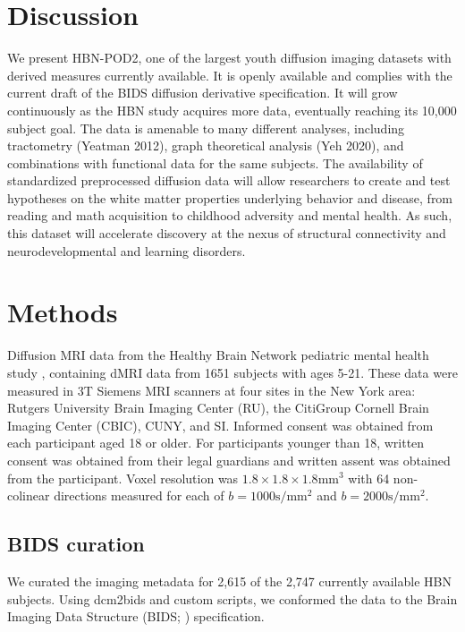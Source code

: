 \documentclass[fleqn,10pt]{wlscirep}
\begin{document}
\section*{Discussion}

We present HBN-POD2, one of the largest youth diffusion imaging datasets with derived measures currently available. It is openly available and complies with the current draft of the BIDS diffusion derivative specification. It will grow continuously as the HBN study acquires more data, eventually reaching its 10,000 subject goal. The data is amenable to many different analyses, including tractometry (Yeatman 2012), graph theoretical analysis (Yeh 2020), and combinations with functional data for the same subjects. The availability of standardized preprocessed diffusion data will allow researchers to create and test hypotheses on the white matter properties underlying behavior and disease, from reading and math acquisition to childhood adversity and mental health. As such, this dataset will accelerate discovery at the nexus of structural connectivity and neurodevelopmental and learning disorders.

\section*{Methods}


Diffusion MRI data from the Healthy Brain Network pediatric mental health study \cite{alexander2017-yc}, containing dMRI data from 1651 subjects with ages 5-21. These data were measured in 3T Siemens MRI scanners at four sites in the New York area: Rutgers University Brain Imaging Center (RU), the CitiGroup Cornell Brain Imaging Center (CBIC), CUNY, and SI.  Informed consent was obtained from each participant aged 18 or older. For participants younger than 18, written consent was obtained from their legal guardians and written assent was obtained from the participant. Voxel resolution was $1.8 \times 1.8 \times 1.8 \text{mm}^3$ with 64 non-colinear directions measured for each of $b=1000 \text{s} / \text{mm}^2$ and $b=2000 \text{s} / \text{mm}^2$.

\subsection*{BIDS curation}

We curated the imaging metadata for 2,615 of the 2,747 currently available HBN subjects. Using dcm2bids and custom scripts, we conformed the data to the Brain Imaging Data Structure (BIDS; \cite{gorgolewski2016-lh}) specification.
\end{document}
